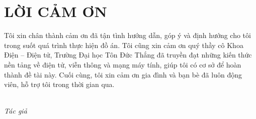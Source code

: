 \chapter*{LỜI CẢM ƠN}
Tôi xin chân thành cảm ơn \gvhd{} đã tận tình hướng dẫn, góp ý và định hướng cho tôi trong suốt quá trình thực hiện đồ án. Tôi cũng xin cảm ơn quý thầy cô Khoa Điện – Điện tử, Trường Đại học Tôn Đức Thắng đã truyền đạt những kiến thức nền tảng về điện tử, viễn thông và mạng máy tính, giúp tôi có cơ sở để hoàn thành đề tài này. Cuối cùng, tôi xin cảm ơn gia đình và bạn bè đã luôn động viên, hỗ trợ tôi trong thời gian qua.

\vspace{1cm}
\hfill\begin{minipage}{0.55\textwidth}\centering
\textit{\ngayky}\\
\textit{Tác giả}\\[2cm]
\textit{\tensinhvienthuong}
\end{minipage}
